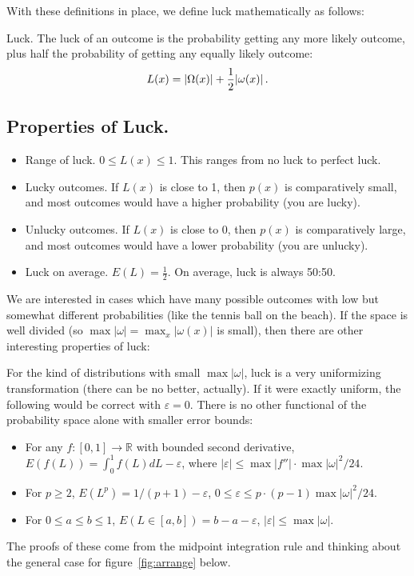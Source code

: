 With these definitions in place, we define luck mathematically as follows:
\begin{definition}{Luck.}  The luck of an outcome is the probability getting any more likely outcome, plus half the probability of getting any equally likely outcome:
\begin{equation}
\index{luck $L$ ! definition}
L(x)=|\Omega(x)| + \frac{1}{2} |\omega(x)| \,.
\end{equation}
\end{definition}

\subsection{Properties of Luck.}
\begin{itemize}
\item Range of luck. $0 \leq L(x) \leq 1$.  This ranges from no luck to perfect luck.
\item Lucky outcomes. If $L(x)$ is close to 1, then $p(x)$ is comparatively small, and most outcomes would have a higher probability (you are lucky).  
\item Unlucky outcomes. If $L(x)$ is close to 0, then $p(x)$ is comparatively large, and most outcomes would have a lower probability (you are unlucky).
\item Luck on average. $E(L)=\frac{1}{2}$.  On average, luck is always 50:50.
\end{itemize}

We are interested in cases which have many possible outcomes with low but somewhat different probabilities (like the tennis ball on the beach).  If the space is well divided (so $\max |\omega|=\max_{x}|\omega(x)|$ is small), then there are other interesting properties of luck:

For the kind of distributions with small $\max |\omega|$, luck is a very uniformizing transformation (there can be no better, actually).  If it were exactly uniform, the following would be correct with $\varepsilon=0$.  There is no other functional of the probability space alone with smaller error bounds:
\begin{itemize}
\item For any $f: [0,1] \rightarrow \mathbb{R}$ with bounded second derivative, $E(f(L))=\int_0^1 f(L) dL-\varepsilon$, where $|\varepsilon| \leq \max|f''| \cdot \max |\omega|^2 / 24$.
\item For $p \geq 2$, $E(L^p)=1/(p+1)-\varepsilon$, $0 \leq \varepsilon \leq p \cdot (p-1) \max |\omega|^2/24$.
\item For $0 \leq a \leq b \leq 1$, $E(L \in [a,b])=b-a - \varepsilon$, $|\varepsilon| \leq \max |\omega|$.
\end{itemize}
The proofs of these come from the midpoint integration rule and thinking about the general case for figure~\ref{fig:arrange} below.

